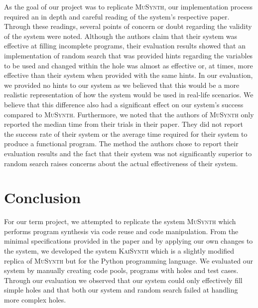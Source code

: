 \documentclass{article}
\begin{document}
As the goal of our project was to replicate \textsc{MuSynth}, our implementation process required an in depth and careful reading of the system's respective paper. Through these readings, several points of concern or doubt regarding the validity of the system were noted. Although the authors claim that their system was effective at filling incomplete programs, their evaluation results showed that an implementation of random search that was provided hints regarding the variables to be used and changed within the hole was almost as effective or, at times, more effective than their system when provided with the same hints. In our evaluation, we provided no hints to our system as we believed that this would be a more realistic representation of how the system would be used in real-life scenarios. We believe that this difference also had a significant effect on our system's success compared to \textsc{MuSynth}. Furthermore, we noted that the authors of \textsc{MuSynth} only reported the median time from their trials in their paper. They did not report the success rate of their system or the average time required for their system to produce a functional program. The method the authors chose to report their evaluation results and the fact that their system was not significantly superior to random search raises concerns about the actual effectiveness of their system. 

\section{Conclusion}

For our term project, we attempted to replicate the system \textsc{MuSynth} which performs program synthesis via code reuse and code manipulation. From the minimal specifications provided in the paper and by applying our own changes to the system, we developed the system \textsc{KaiSynth} which is a slightly modified replica of \textsc{MuSynth} but for the Python programming language. We evaluated our system by manually creating code pools, programs with holes and test cases. Through our evaluation we observed that our system could only effectively fill simple holes and that both our system and random search failed at handling more complex holes. 
\end{document}
